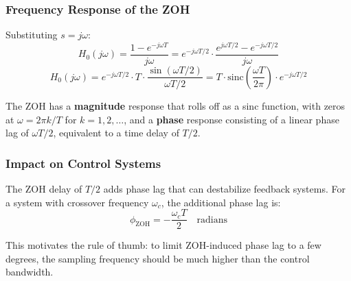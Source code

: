 \subsubsection{Frequency Response of the ZOH}

Substituting $s = j\omega$:
\begin{equation}
H_0(j\omega) = \frac{1 - e^{-j\omega T}}{j\omega} = e^{-j\omega T/2} \cdot \frac{e^{j\omega T/2} - e^{-j\omega T/2}}{j\omega}
\end{equation}
\begin{equation}
H_0(j\omega) = e^{-j\omega T/2} \cdot T \cdot \frac{\sin(\omega T/2)}{\omega T/2} = T \cdot \mathrm{sinc}\left(\frac{\omega T}{2\pi}\right) \cdot e^{-j\omega T/2}
\label{eq:zoh_frequency_response}
\end{equation}

The ZOH has a \textbf{magnitude} response that rolls off as a sinc function, with zeros at $\omega = 2\pi k/T$ for $k = 1, 2, \ldots$, and a \textbf{phase} response consisting of a linear phase lag of $\omega T/2$, equivalent to a time delay of $T/2$.

\subsubsection{Impact on Control Systems}

The ZOH delay of $T/2$ adds phase lag that can destabilize feedback systems. For a system with crossover frequency $\omega_c$, the additional phase lag is:
\begin{equation}
\phi_{\text{ZOH}} = -\frac{\omega_c T}{2} \quad \text{radians}
\label{eq:zoh_phase_lag}
\end{equation}

This motivates the rule of thumb: to limit ZOH-induced phase lag to a few degrees, the sampling frequency should be much higher than the control bandwidth.

